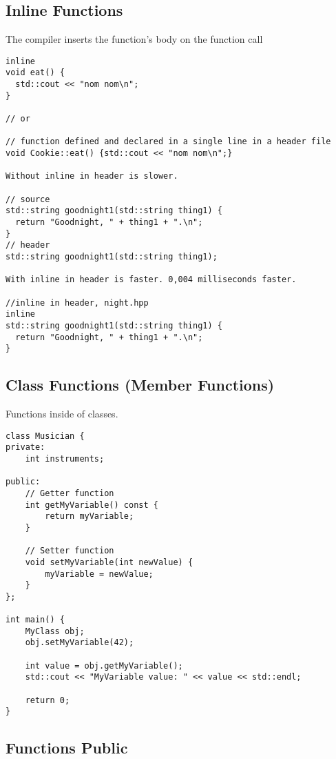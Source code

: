 \subsection{Inline Functions}

The compiler inserts the function’s body on the function call

\begin{verbatim}
inline 
void eat() {
  std::cout << "nom nom\n";
}

// or

// function defined and declared in a single line in a header file
void Cookie::eat() {std::cout << "nom nom\n";}

Without inline in header is slower.

// source
std::string goodnight1(std::string thing1) {
  return "Goodnight, " + thing1 + ".\n";
}
// header
std::string goodnight1(std::string thing1);

With inline in header is faster. 0,004 milliseconds faster.

//inline in header, night.hpp
inline
std::string goodnight1(std::string thing1) {
  return "Goodnight, " + thing1 + ".\n";
}
\end{verbatim}

\subsection{Class Functions (Member Functions)}

Functions inside of classes.

\begin{verbatim}
class Musician {
private:
    int instruments;

public:
    // Getter function
    int getMyVariable() const {
        return myVariable;
    }

    // Setter function
    void setMyVariable(int newValue) {
        myVariable = newValue;
    }
};

int main() {
    MyClass obj;
    obj.setMyVariable(42);

    int value = obj.getMyVariable();
    std::cout << "MyVariable value: " << value << std::endl;

    return 0;
}
\end{verbatim}

\subsection{Functions Public}

